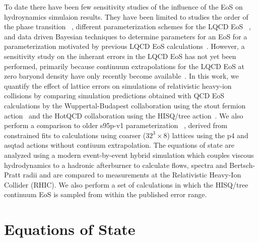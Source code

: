\documentclass[aps,prc,reprint,amsmath,nofootinbib,superscriptaddress]{revtex4-1}
\begin{document}

To date there have been few sensitivity studies of the influence of the EoS on hydroynamics simulaion results.  They have been limited to studies the order 
of the phase transition~ \cite{Huovinen:2005gy}, different parameterization schemes for the LQCD EoS ~\cite{Huovinen:2009yb}, and data driven Bayesian 
techniques to determine parameters for an EoS for a parameterization motivated by previous LQCD EoS calculations~\cite{Pratt:2015vb}.  However, a sensitivity
study on the inherant errors in the LQCD EoS has not yet been performed, primarily because continuum extrapolations for the LQCD EoS at zero
baryond density have only recently become available~\cite{Borsanyi:2013bia,Bazavov:2014pvz}.
In this work, we quantify the effect of lattice errors on simulations of relativistic heavy-ion collisions by comparing simulation predictions obtained 
with QCD EoS calculations by the Wuppertal-Budapest collaboration using the stout fermion action~\cite{Borsanyi:2013bia} and the HotQCD collaboration 
using the HISQ/tree action~\cite{Bazavov:2014pvz}.  We also perform a comparison to older s95p-v1 parameterization ~\cite{Huovinen:2009yb}, derived from 
constrained fits to calculations using coarser ($32^3 \times 8$) lattices using the p4 and asqtad actions without contiuum extrapolation.  The equations of 
state are analyzed using a modern event-by-event hybrid simulation which couples viscous hydrodynamics to a hadronic afterburner to calculate flows, spectra 
and Bertsch-Pratt radii and are compared to measurements at the Relativistic Heavy-Ion Collider (RHIC).  We also perform a set of calculations in which the 
HISQ/tree continuum EoS is sampled from within the published error range.


\section{Equations of State}
\label{eos}
\end{document}
